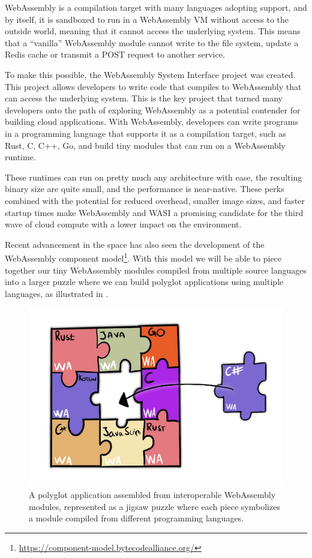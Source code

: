 \documentclass[
  table]{report}
\begin{document}
WebAssembly is a compilation target with many languages adopting
support, and by itself, it is sandboxed to run in a WebAssembly \ac{VM}
without access to the outside world, meaning that it cannot access the
underlying system. This means that a ``vanilla'' WebAssembly module
cannot write to the file system, update a Redis cache or transmit a POST
request to another service.

To make this possible, the WebAssembly System Interface project was
created. This project allows developers to write code that compiles to
WebAssembly that can access the underlying system. This is the key
project that turned many developers onto the path of exploring
WebAssembly as a potential contender for building cloud applications.
With WebAssembly, developers can write programs in a programming
language that supports it as a compilation target, such as Rust, C, C++,
Go, and build tiny modules that can run on a WebAssembly runtime.

These runtimes can run on pretty much any architecture with ease, the
resulting binary size are quite small, and the performance is
near-native. These perks combined with the potential for reduced
overhead, smaller image sizes, and faster startup times make WebAssembly
and \ac{WASI} a promising candidate for the third wave of cloud compute
with a lower impact on the environment.

Recent advancement in the space has also seen the development of the
WebAssembly component model\footnote{\url{https://component-model.bytecodealliance.org/}}.
With this model we will be able to piece together our tiny WebAssembly
modules compiled from multiple source languages into a larger puzzle
where we can build polyglot applications using multiple languages, as
illustrated in .

\begin{figure}[H]
\centering
  \includegraphics[width=0.8\columnwidth]{assets/wasm-wave.jpg}
  \caption{A polyglot application assembled from interoperable WebAssembly
modules, represented as a jigsaw puzzle where each piece symbolizes a module
compiled from different programming languages.}
  \label{fig:wasm-wave}
\end{figure}
\end{document}
